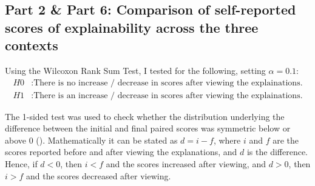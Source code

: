 \subsection{Part 2 \& Part 6: Comparison of self-reported scores of explainability across the three contexts}
Using the Wilcoxon Rank Sum Test, I tested for the following, setting $\alpha = 0.1$: 
\begin{align*}
    H0&: \text{There is no increase / decrease in scores after viewing the explainations.} \\
    H1&: \text{There is an increase / decrease in scores after viewing the explainations.}
\end{align*}

The 1-sided test was used to check whether the distribution underlying the difference between the initial and final paired scores was symmetric below or above 0 (\cite{scipy}). Mathematically it can be stated as $d = i - f$, where $i$ and $f$ are the scores reported before and after viewing the explanations, and $d$ is the difference. Hence, if $d < 0$, then $i < f$ and the scores increased after viewing, and $d > 0$, then $i > f$ and the scores decreased after viewing.

\begin{table}[!ht]
    \centering
    \caption{p-values comparing whether there was a statistically significant increase / decrease in the explainability scores before and after viewing explanations.}
    \label{tab:context_comparison}
\end{table}


